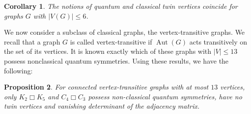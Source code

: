 \documentclass[11pt,reqno]{amsart}
\newtheorem{proposition}{Proposition}[section]
\newtheorem{corollary}[proposition]{Corollary}
\DeclareMathOperator{\Aut}{Aut}
\begin{document}
\begin{corollary}
The notions of quantum and classical twin vertices coincide for graphs $G$ with $|V(G)|\leq 6$.
\end{corollary}

We now consider a subclass of classical graphs, the vertex-transitive graphs. We recall that a graph $G$ is called vertex-transitive if $\Aut(G)$ acts transitively on the set of its vertices. It is known\cite{Banica07,  Chassaniol, Chassaniol19, Schanz24, Schmidt18} exactly which of these graphs with $|V|\leq 13$ possess nonclassical quantum symmetries. Using these results, we have the following:

\begin{proposition}
For connected vertex-transitive graphs with at most $13$ vertices, only $K_2\Box K_5$ and $C_4\Box C_3$ possess non-classical quantum symmetries, have no twin vertices and vanishing determinant of the adjacency matrix.
\end{proposition}
\end{document}
